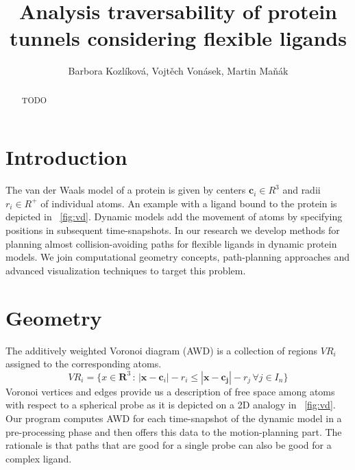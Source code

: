 \documentclass[conference]{IEEEtran}
\title{Analysis traversability of  protein tunnels considering flexible ligands}
\author{
Barbora Kozl\'{i}kov\'{a}, Vojt\v{e}ch Von\'{a}sek, Martin Ma\v{n}\'{a}k
}
\begin{document}
\maketitle

\begin{abstract}
TODO
\end{abstract}

\section{Introduction}

The van der Waals model of a protein is given by centers $\mathbf{c}_i \in R^3$ and radii $r_i \in R^+$ of individual atoms. An example with a ligand bound to the protein is depicted in \figurename~\ref{fig:vd}. Dynamic models add the movement of atoms by specifying positions in subsequent time-snapshots. In our research we develop methods for planning almost collision-avoiding paths for flexible ligands in dynamic protein models. We join computational geometry concepts, path-planning approaches and advanced visualization techniques to target this problem.

\section{Geometry}

The additively weighted Voronoi diagram (AWD) is a collection of regions $V\!R_i$ assigned to the corresponding atoms.
\[V\!R_i = \{x \in \mathbf{R}^3 \,:\,|\mathbf{x}-\mathbf{c}_i|-r_i \leq |\mathbf{x}-\mathbf{c_j}|-r_j\,\forall j \in I_n \}\]
Voronoi vertices and edges provide us a description of free space among atoms with respect to a spherical probe as it is depicted on a 2D analogy in \figurename~\ref{fig:vd}. Our program computes AWD for each time-snapshot of the dynamic model in a pre-processing phase and then offers this data to the motion-planning part. The rationale is that paths that are good for a single probe can also be good for a complex ligand.
\end{document}
